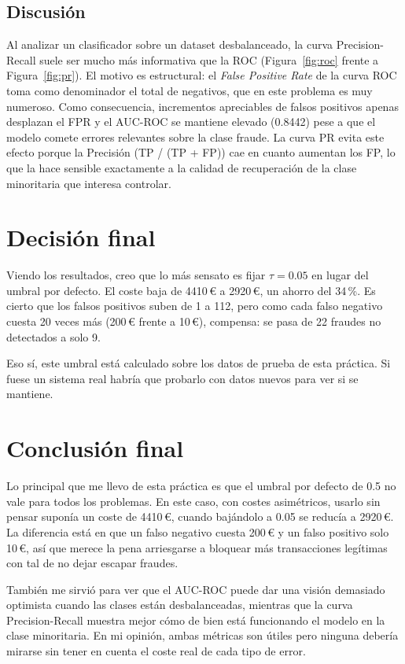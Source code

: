\documentclass[../../__memoria.tex]{subfiles}
\begin{document}
\subsection{Discusión}
Al analizar un clasificador sobre un dataset desbalanceado, la curva Precision-Recall suele ser mucho más informativa que la ROC (Figura~\ref{fig:roc} frente a Figura~\ref{fig:pr}). El motivo es estructural: el \textit{False Positive Rate} de la curva ROC toma como denominador el total de negativos, que en este problema es muy numeroso. Como consecuencia, incrementos apreciables de falsos positivos apenas desplazan el FPR y el AUC-ROC se mantiene elevado (0.8442) pese a que el modelo comete errores relevantes sobre la clase fraude. La curva PR evita este efecto porque la Precisión (TP / (TP + FP)) cae en cuanto aumentan los FP, lo que la hace sensible exactamente a la calidad de recuperación de la clase minoritaria que interesa controlar.


\section{Decisión final}

Viendo los resultados, creo que lo más sensato es fijar $\tau = 0.05$ en lugar del umbral por defecto. El coste baja de 4410\,€ a 2920\,€, un ahorro del 34\,\%. Es cierto que los falsos positivos suben de 1 a 112, pero como cada falso negativo cuesta 20 veces más (200\,€ frente a 10\,€), compensa: se pasa de 22 fraudes no detectados a solo 9.

Eso sí, este umbral está calculado sobre los datos de prueba de esta práctica. Si fuese un sistema real habría que probarlo con datos nuevos para ver si se mantiene.

\section{Conclusión final}

Lo principal que me llevo de esta práctica es que el umbral por defecto de 0.5 no vale para todos los problemas. En este caso, con costes asimétricos, usarlo sin pensar suponía un coste de 4410\,€, cuando bajándolo a 0.05 se reducía a 2920\,€. La diferencia está en que un falso negativo cuesta 200\,€ y un falso positivo solo 10\,€, así que merece la pena arriesgarse a bloquear más transacciones legítimas con tal de no dejar escapar fraudes.

También me sirvió para ver que el AUC-ROC puede dar una visión demasiado optimista cuando las clases están desbalanceadas, mientras que la curva Precision-Recall muestra mejor cómo de bien está funcionando el modelo en la clase minoritaria. En mi opinión, ambas métricas son útiles pero ninguna debería mirarse sin tener en cuenta el coste real de cada tipo de error.
\end{document}
